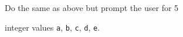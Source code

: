 Do the same as above but prompt the user for 5

integer values \texttt{a}, \texttt{b}, \texttt{c}, \texttt{d}, \texttt{e}.

